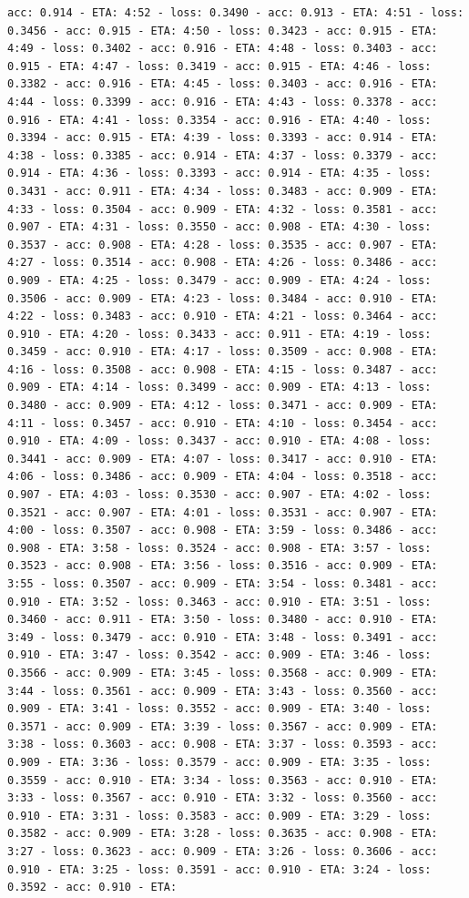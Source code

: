 \documentclass[11pt]{article}
\begin{document}
\begin{Verbatim}[commandchars=\\\{\}]
acc: 0.914 - ETA: 4:52 - loss: 0.3490 - acc: 0.913 - ETA: 4:51 - loss: 0.3456 - acc: 0.915 - ETA: 4:50 - loss: 0.3423 - acc: 0.915 - ETA: 4:49 - loss: 0.3402 - acc: 0.916 - ETA: 4:48 - loss: 0.3403 - acc: 0.915 - ETA: 4:47 - loss: 0.3419 - acc: 0.915 - ETA: 4:46 - loss: 0.3382 - acc: 0.916 - ETA: 4:45 - loss: 0.3403 - acc: 0.916 - ETA: 4:44 - loss: 0.3399 - acc: 0.916 - ETA: 4:43 - loss: 0.3378 - acc: 0.916 - ETA: 4:41 - loss: 0.3354 - acc: 0.916 - ETA: 4:40 - loss: 0.3394 - acc: 0.915 - ETA: 4:39 - loss: 0.3393 - acc: 0.914 - ETA: 4:38 - loss: 0.3385 - acc: 0.914 - ETA: 4:37 - loss: 0.3379 - acc: 0.914 - ETA: 4:36 - loss: 0.3393 - acc: 0.914 - ETA: 4:35 - loss: 0.3431 - acc: 0.911 - ETA: 4:34 - loss: 0.3483 - acc: 0.909 - ETA: 4:33 - loss: 0.3504 - acc: 0.909 - ETA: 4:32 - loss: 0.3581 - acc: 0.907 - ETA: 4:31 - loss: 0.3550 - acc: 0.908 - ETA: 4:30 - loss: 0.3537 - acc: 0.908 - ETA: 4:28 - loss: 0.3535 - acc: 0.907 - ETA: 4:27 - loss: 0.3514 - acc: 0.908 - ETA: 4:26 - loss: 0.3486 - acc: 0.909 - ETA: 4:25 - loss: 0.3479 - acc: 0.909 - ETA: 4:24 - loss: 0.3506 - acc: 0.909 - ETA: 4:23 - loss: 0.3484 - acc: 0.910 - ETA: 4:22 - loss: 0.3483 - acc: 0.910 - ETA: 4:21 - loss: 0.3464 - acc: 0.910 - ETA: 4:20 - loss: 0.3433 - acc: 0.911 - ETA: 4:19 - loss: 0.3459 - acc: 0.910 - ETA: 4:17 - loss: 0.3509 - acc: 0.908 - ETA: 4:16 - loss: 0.3508 - acc: 0.908 - ETA: 4:15 - loss: 0.3487 - acc: 0.909 - ETA: 4:14 - loss: 0.3499 - acc: 0.909 - ETA: 4:13 - loss: 0.3480 - acc: 0.909 - ETA: 4:12 - loss: 0.3471 - acc: 0.909 - ETA: 4:11 - loss: 0.3457 - acc: 0.910 - ETA: 4:10 - loss: 0.3454 - acc: 0.910 - ETA: 4:09 - loss: 0.3437 - acc: 0.910 - ETA: 4:08 - loss: 0.3441 - acc: 0.909 - ETA: 4:07 - loss: 0.3417 - acc: 0.910 - ETA: 4:06 - loss: 0.3486 - acc: 0.909 - ETA: 4:04 - loss: 0.3518 - acc: 0.907 - ETA: 4:03 - loss: 0.3530 - acc: 0.907 - ETA: 4:02 - loss: 0.3521 - acc: 0.907 - ETA: 4:01 - loss: 0.3531 - acc: 0.907 - ETA: 4:00 - loss: 0.3507 - acc: 0.908 - ETA: 3:59 - loss: 0.3486 - acc: 0.908 - ETA: 3:58 - loss: 0.3524 - acc: 0.908 - ETA: 3:57 - loss: 0.3523 - acc: 0.908 - ETA: 3:56 - loss: 0.3516 - acc: 0.909 - ETA: 3:55 - loss: 0.3507 - acc: 0.909 - ETA: 3:54 - loss: 0.3481 - acc: 0.910 - ETA: 3:52 - loss: 0.3463 - acc: 0.910 - ETA: 3:51 - loss: 0.3460 - acc: 0.911 - ETA: 3:50 - loss: 0.3480 - acc: 0.910 - ETA: 3:49 - loss: 0.3479 - acc: 0.910 - ETA: 3:48 - loss: 0.3491 - acc: 0.910 - ETA: 3:47 - loss: 0.3542 - acc: 0.909 - ETA: 3:46 - loss: 0.3566 - acc: 0.909 - ETA: 3:45 - loss: 0.3568 - acc: 0.909 - ETA: 3:44 - loss: 0.3561 - acc: 0.909 - ETA: 3:43 - loss: 0.3560 - acc: 0.909 - ETA: 3:41 - loss: 0.3552 - acc: 0.909 - ETA: 3:40 - loss: 0.3571 - acc: 0.909 - ETA: 3:39 - loss: 0.3567 - acc: 0.909 - ETA: 3:38 - loss: 0.3603 - acc: 0.908 - ETA: 3:37 - loss: 0.3593 - acc: 0.909 - ETA: 3:36 - loss: 0.3579 - acc: 0.909 - ETA: 3:35 - loss: 0.3559 - acc: 0.910 - ETA: 3:34 - loss: 0.3563 - acc: 0.910 - ETA: 3:33 - loss: 0.3567 - acc: 0.910 - ETA: 3:32 - loss: 0.3560 - acc: 0.910 - ETA: 3:31 - loss: 0.3583 - acc: 0.909 - ETA: 3:29 - loss: 0.3582 - acc: 0.909 - ETA: 3:28 - loss: 0.3635 - acc: 0.908 - ETA: 3:27 - loss: 0.3623 - acc: 0.909 - ETA: 3:26 - loss: 0.3606 - acc: 0.910 - ETA: 3:25 - loss: 0.3591 - acc: 0.910 - ETA: 3:24 - loss: 0.3592 - acc: 0.910 - ETA: 
\end{Verbatim}
\end{document}
